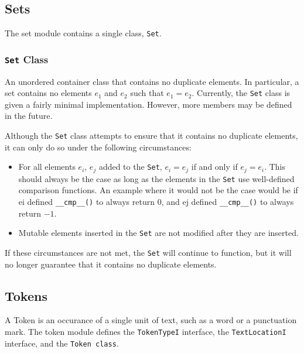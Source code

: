 \documentclass{article}
\begin{document}
\subsection{Sets}

The set module contains a single class, \texttt{Set}.

\subsubsection{\texttt{Set} Class}

    An unordered container class that contains no duplicate elements.
    In particular, a set contains no elements $e_1$ and $e_2$ such
    that $e_1=e_2$.  Currently, the \texttt{Set} class is given a
    fairly minimal implementation.  However, more members may be
    defined in the future.

    Although the \texttt{Set} class attempts to ensure that it
    contains no duplicate elements, it can only do so under the
    following circumstances:
    
    \begin{itemize}
      \item For all elements $e_i$, $e_j$ added to the \texttt{Set},
           $e_i=e_j$ if and only if $e_j=e_i$.  This should always be the
           case as long as the elements in the \texttt{Set} use
           well-defined comparison functions.  An example where it
           would not be the case would be if ei defined
           \texttt{\_\_cmp\_\_()} to always return 0, and ej
           defined \texttt{\_\_cmp\_\_()} to always return $-1$.
           
      \item Mutable elements inserted in the \texttt{Set} are not
           modified after they are inserted.
    \end{itemize}

    If these circumstances are not met, the \texttt{Set} will
    continue to function, but it will no longer guarantee that it
    contains no duplicate elements.
 
\subsection{Tokens}

A Token is an occurance of a single unit of text, such as a word or a
punctuation mark.  The token module defines the \texttt{TokenTypeI}
interface, the \texttt{TextLocationI} interface, and the \texttt{Token
class}.
\end{document}
